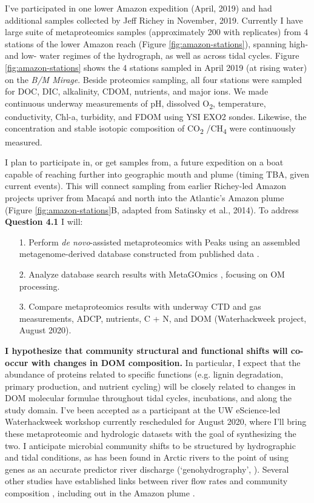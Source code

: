 \documentclass[12pt, letterpaper, twoside]{article}
\begin{document}
I've participated in one lower Amazon expedition (April, 2019) and had additional samples collected by Jeff Richey in November, 2019. Currently I have large suite of metaproteomics samples (approximately 200 with replicates) from 4 stations of the lower Amazon reach (Figure \ref{fig:amazon-stations}), spanning high- and low- water regimes of the hydrograph, as well as across tidal cycles. Figure \ref{fig:amazon-stations} shows the 4 stations sampled in April 2019 (at rising water) on the \textit{B/M Mirage}. Beside proteomics sampling, all four stations were sampled for DOC, DIC, alkalinity, CDOM, nutrients, and major ions. We made continuous underway measurements of pH, dissolved O\textsubscript{2}, temperature, conductivity, Chl-a, turbidity, and FDOM using YSI EXO2 sondes. Likewise, the concentration and stable isotopic composition of CO\textsubscript{2} /CH\textsubscript{4} were continuously measured. 


I plan to participate in, or get samples from, a future expedition on a boat capable of reaching further into geographic mouth and plume (timing TBA, given current events). This will connect sampling from earlier Richey-led Amazon projects upriver from Macap\'{a} and north into the Atlantic's Amazon plume (Figure \ref{fig:amazon-stations}B, adapted from Satinsky et al., 2014). To address \textbf{Question 4.1} I will:

\begin{enumerate}
	\item[1.] Perform \textit{de novo}-assisted metaproteomics with Peaks using an assembled metagenome-derived database constructed from published data \cite{satinsky_amazon_2014, doherty_bacterial_2017, satinsky_metagenomic_2015, ghai_metagenomics_2011}.
	\item[2.] Analyze database search results with MetaGOmics \cite{riffle_metagomics_2017}, focusing on OM processing.
	\item[3.] Compare metaproteomics results with underway CTD and gas measurements, ADCP, nutrients, C + N, and DOM (Waterhackweek project, August 2020). 
\end{enumerate}  

\bigskip

\textbf{I hypothesize that community structural and functional shifts will co-occur with changes in DOM composition.} In particular, I expect that the abundance of proteins related to specific functions (e.g. lignin degradation, primary production, and nutrient cycling) will be closely related to changes in DOM molecular formulae throughout tidal cycles, incubations, and along the study domain. I've been accepted as a participant at the UW eScience-led Waterhackweek workshop currently rescheduled for August 2020, where I'll bring these metaproteomic and hydrologic datasets with the goal of synthesizing the two. I anticipate microbial community shifts to be structured by hydrographic and tidal conditions, as has been found in Arctic rivers to the point of using genes as an accurate predictor river discharge (‘genohydrography’, \cite{good_predicting_2018}). Several other studies have established links between river flow rates and community composition \cite{crump_synchrony_2005}, including out in the Amazon plume \cite{doherty_bacterial_2017}. 
 
\end{document}
